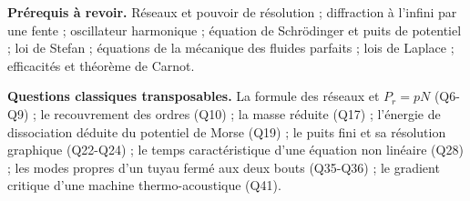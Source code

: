 \documentclass[11pt,a4paper]{article}
\begin{document}
\textbf{Prérequis à revoir.} Réseaux et pouvoir de résolution ; diffraction à l'infini par une fente ; oscillateur harmonique ; équation de Schrödinger et puits de potentiel ; loi de Stefan ; équations de la mécanique des fluides parfaits ; lois de Laplace ; efficacités et théorème de Carnot.

\textbf{Questions classiques transposables.} La formule des réseaux et \(P_r = pN\) (Q6-Q9) ; le recouvrement des ordres (Q10) ; la masse réduite (Q17) ; l'énergie de dissociation déduite du potentiel de Morse (Q19) ; le puits fini et sa résolution graphique (Q22-Q24) ; le temps caractéristique d'une équation non linéaire (Q28) ; les modes propres d'un tuyau fermé aux deux bouts (Q35-Q36) ; le gradient critique d'une machine thermo-acoustique (Q41).
\end{document}

